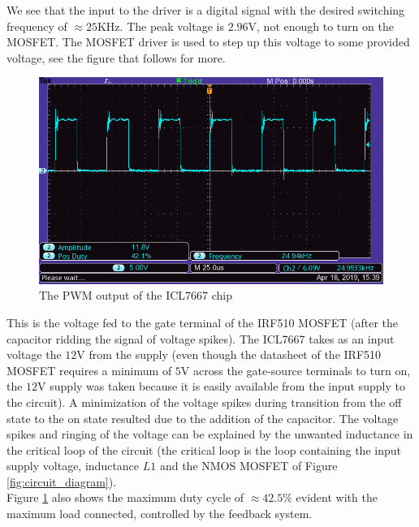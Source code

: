 \documentclass[a4paper, 12pt]{article}
\begin{document}
We see that the input to the driver is a digital signal with the desired switching frequency of $\approx 25$KHz. The peak voltage is $2.96$V, not enough to turn on the MOSFET. The MOSFET driver is used to step up this voltage to some provided voltage, see the figure that follows for more.

\begin{figure}[H]
  \centering
  \includegraphics[width=\textwidth]{images/pwm_output_from_chip.png}
  \caption{The PWM output of the ICL7667 chip}
  \label{fig:pwm_output_from_chip}
\end{figure}


This is the voltage fed to the gate terminal of the IRF510 MOSFET (after the
capacitor ridding the signal of voltage spikes). The ICL7667 takes as an input
voltage the $12$V from the supply (even though the datasheet of the IRF510
MOSFET requires a minimum of $5$V across the gate-source terminals to turn on,
the $12$V supply was taken because it is easily available from the input supply
to the circuit). A minimization of the voltage spikes during transition from
the off state to the on state resulted due to the addition of the capacitor.
The voltage spikes and ringing of the voltage can be explained by the unwanted
inductance in the critical loop of the circuit (the critical loop is the loop
containing the input supply voltage, inductance $L1$ and the NMOS MOSFET of Figure
\ref{fig:circuit_diagram}). \\

Figure \ref{fig:pwm_output_from_chip} also shows the maximum duty cycle of $\approx 42.5\%$ evident with the maximum load connected, controlled by the feedback system. \\
\end{document}

